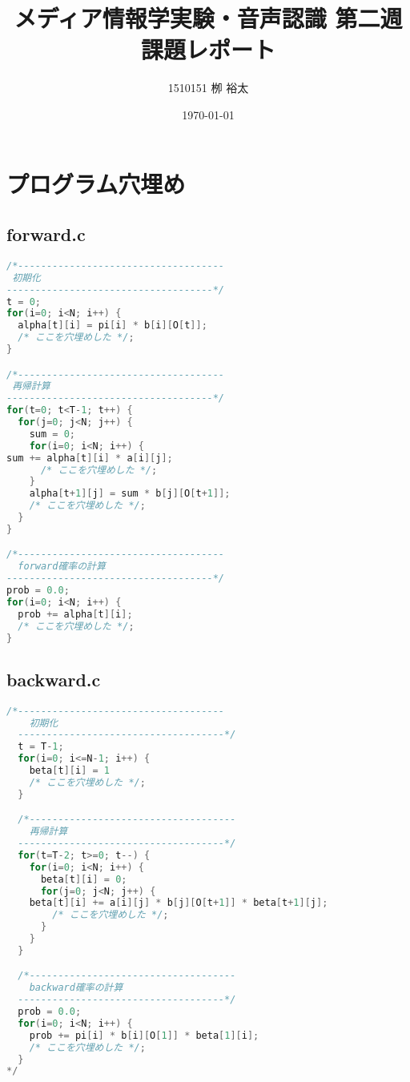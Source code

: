\documentclass[11pt,a4paper, uplatex]{jsarticle}
\title{メディア情報学実験・音声認識 第二週課題レポート}
\author{1510151  栁 裕太}
\date{\today}
\begin{document}
\maketitle
\section{プログラム穴埋め}

\subsection{forward.c}

\begin{lstlisting}[language=c, caption=\texttt{forward}関数一部]
/*------------------------------------
 初期化
------------------------------------*/
t = 0;
for(i=0; i<N; i++) {
  alpha[t][i] = pi[i] * b[i][O[t]];
  /* ここを穴埋めした */;
}

/*------------------------------------
 再帰計算
------------------------------------*/
for(t=0; t<T-1; t++) {
  for(j=0; j<N; j++) {
    sum = 0;
    for(i=0; i<N; i++) {
sum += alpha[t][i] * a[i][j];
      /* ここを穴埋めした */;
    }
    alpha[t+1][j] = sum * b[j][O[t+1]];
    /* ここを穴埋めした */;
  }
}

/*------------------------------------
  forward確率の計算
------------------------------------*/
prob = 0.0;
for(i=0; i<N; i++) {
  prob += alpha[t][i];
  /* ここを穴埋めした */;
}
\end{lstlisting}

\subsection{backward.c}

\begin{lstlisting}[language=c, breaklines = true, caption=\texttt{backward}関数一部]
  /*------------------------------------
    初期化
  ------------------------------------*/
  t = T-1;
  for(i=0; i<=N-1; i++) {
    beta[t][i] = 1
    /* ここを穴埋めした */;
  }

  /*------------------------------------
    再帰計算
  ------------------------------------*/
  for(t=T-2; t>=0; t--) {
    for(i=0; i<N; i++) {
      beta[t][i] = 0;
      for(j=0; j<N; j++) {
	beta[t][i] += a[i][j] * b[j][O[t+1]] * beta[t+1][j];
        /* ここを穴埋めした */;
      }
    }
  }

  /*------------------------------------
    backward確率の計算
  ------------------------------------*/
  prob = 0.0;
  for(i=0; i<N; i++) {
    prob += pi[i] * b[i][O[1]] * beta[1][i];
    /* ここを穴埋めした */;
  }
*/\end{lstlisting}
\end{document}
